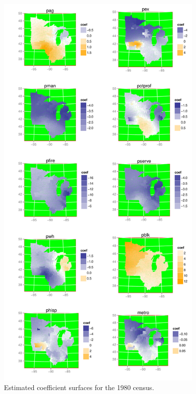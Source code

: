\documentclass[authoryear, review, 11pt]{elsarticle}
\begin{document}
	\begin{figure}
		\begin{center}
			\includegraphics[height=8in]{../../figures/poverty/1980.linear.coefficients.pdf}
			\caption{Estimated coefficient surfaces for the 1980 census.\label{fig:1980}}
		\end{center}
	\end{figure}
	
\end{document}

